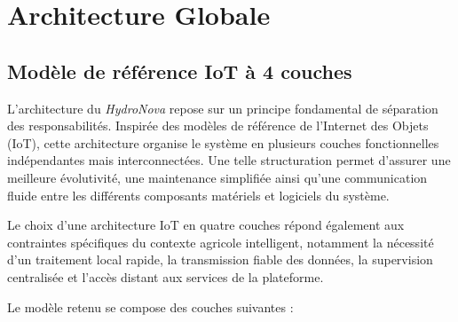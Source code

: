 \section{Architecture Globale}
\label{sec:glob}

\subsection{Modèle de référence IoT à 4 couches}
L’architecture du \textit{HydroNova} repose sur un principe fondamental de séparation des responsabilités. Inspirée des modèles de référence de l’Internet des Objets (IoT), cette architecture organise le système en plusieurs couches fonctionnelles indépendantes mais interconnectées. Une telle structuration permet d’assurer une meilleure évolutivité, une maintenance simplifiée ainsi qu’une communication fluide entre les différents composants matériels et logiciels du système.

Le choix d’une architecture IoT en quatre couches répond également aux contraintes spécifiques du contexte agricole intelligent, notamment la nécessité d’un traitement local rapide, la transmission fiable des données, la supervision centralisée et l’accès distant aux services de la plateforme.

Le modèle retenu se compose des couches suivantes :

